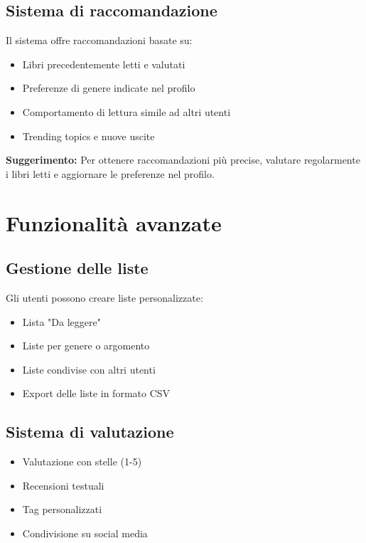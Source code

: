 \documentclass[12pt,a4paper]{article}
\begin{document}
\subsection{Sistema di raccomandazione}

Il sistema offre raccomandazioni basate su:

\begin{itemize}
    \item Libri precedentemente letti e valutati
    \item Preferenze di genere indicate nel profilo
    \item Comportamento di lettura simile ad altri utenti
    \item Trending topics e nuove uscite
\end{itemize}

\begin{infobox}
\textbf{Suggerimento:} Per ottenere raccomandazioni più precise, valutare regolarmente i libri letti e aggiornare le preferenze nel profilo.
\end{infobox}

\section{Funzionalità avanzate}

\subsection{Gestione delle liste}

Gli utenti possono creare liste personalizzate:

\begin{itemize}
    \item Lista "Da leggere"
    \item Liste per genere o argomento
    \item Liste condivise con altri utenti
    \item Export delle liste in formato CSV
\end{itemize}

\subsection{Sistema di valutazione}

\begin{itemize}
    \item Valutazione con stelle (1-5)
    \item Recensioni testuali
    \item Tag personalizzati
    \item Condivisione su social media
\end{itemize}
\end{document}
